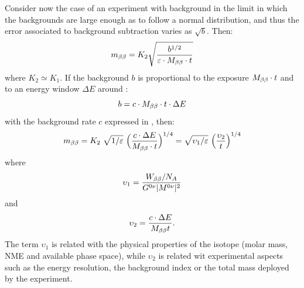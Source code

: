 Consider now the case of an experiment with background in the limit in which the backgrounds are large enough as to follow a normal distribution, and thus the error associated to background subtraction varies as $\sqrt{b}$. Then:
%
\begin{equation}
m_{\beta\beta} =K_{2} \sqrt{\frac{b^{1/2}}{\varepsilon\cdot M_{\beta\beta} \cdot t}} 
\label{eq:mbbx1}
\end{equation}
%
where $K_{2}\simeq K_1$. If the background $b$ is proportional to the exposure $M_{\beta\beta} \cdot t$ and to an energy window $\Delta E$ around \Qbb :
\begin{equation}
b = c\cdot M_{\beta\beta} \cdot t\cdot \Delta E
\label{eq:mbbx2}
\end{equation}
%
with the background rate $c$ expressed in \ckkbby, then:
%
\begin{equation}
\mbb = K_2  \ \sqrt{1/\varepsilon} \ \Big(\frac{c\cdot \Delta E}{\Mbb \cdot t}\Big)^{1/4} 
= \sqrt{\upsilon_1/\varepsilon}  \ \Big(\frac{\upsilon_2}{t}\Big)^{1/4} 
\label{eq:mbbx3}
\end{equation}
%
where 
$$\upsilon_1 = \frac{W_{\beta\beta}/N_A}{G^{0\nu}\lvert M^{0\nu}\rvert^2}$$ 
and 
$$\upsilon_2 = \frac{c\cdot \Delta E}{M_{\beta\beta} t}.$$ 
%
%
The term $\upsilon_1$ is related with the physical properties of the isotope (molar mass, NME and available phase space), while $\upsilon_2$ is related wit experimental aspects such as the energy resolution, the background index or the total mass deployed by the experiment. 




